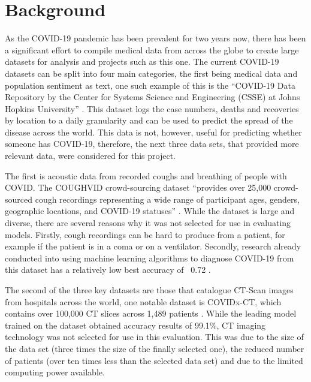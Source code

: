 \section{Background}
As the COVID-19 pandemic has been prevalent for two years now, there has been a significant effort to compile medical data from across the globe to create large datasets for analysis and projects such as this one. The current COVID-19 datasets can be split into four main categories, the first being medical data and population sentiment as text, one such example of this is the “COVID-19 Data Repository by the Center for Systems Science and Engineering (CSSE) at Johns Hopkins University” \citep{dong2020interactive}. This dataset logs the case numbers, deaths and recoveries by location to a daily granularity and can be used to predict the spread of the disease across the world. This data is not, however, useful for predicting whether someone has COVID-19, therefore, the next three data sets, that provided more relevant data, were considered for this project.

The first is acoustic data from recorded coughs and breathing of people with COVID. The COUGHVID crowd-sourcing dataset “provides over 25,000 crowd-sourced cough recordings representing a wide range of participant ages, genders, geographic locations, and COVID-19 statuses” \citep[pg. 1]{orlandic2021coughvid}. While the dataset is large and diverse, there are several reasons why it was not selected for use in evaluating models. Firstly, cough recordings can be hard to produce from a patient, for example if the patient is in a coma or on a ventilator. Secondly, research already conducted into using machine learning algorithms to diagnose COVID-19 from this dataset has a relatively low best accuracy of ~0.72 \citep{chang2021covnet}. 

The second of the three key datasets are those that catalogue CT-Scan images from hospitals across the world, one notable dataset is COVIDx-CT, which contains over 100,000 CT slices across 1,489 patients \citep{gunraj2020covidnet}. While the leading model trained on the dataset obtained accuracy results of 99.1\%, CT imaging technology was not selected for use in this evaluation. This was due to the size of the data set (three times the size of the finally selected one), the reduced number of patients (over ten times less than the selected data set) and due to the limited computing power available.

